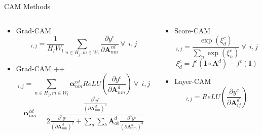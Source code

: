 \documentclass[aspectratio=169]{beamer}
\let\oldcite\cite %
\renewcommand{\cite}[1]{{\tiny\oldcite{#1}}}
\begin{document}
\begin{frame}{CAM Methods}
\begin{columns}[t] %
    \begin{column}{0.5\textwidth}
      \centering

    \begin{itemize}

    \item Grad-CAM \cite{Selvaraju2016}
        \begin{equation*}
                [\boldsymbol{\beta}_l^{cd}]_{i,j} = \frac{1}{H_lW_l} \sum_{n \in H_j, m \in W_l}\frac{\partial y^c}{\partial \mathbf{A}_{nm}^{cd}} \ \forall \ \ i,j 
        \end{equation*}
        
    \item Grad-CAM ++ \cite{Chattopadhyay2017}
            \begin{equation*}
                 [\boldsymbol{\beta}_l^{cd}]_{i,j} = \sum_{n \in H_j, m \in W_l}  \boldsymbol{\alpha}_{nm}^{cd} ReLU(\frac{\partial y^c}{\partial \mathbf{A}_{nm}^d}) \ \forall \ \ i,j 
            \end{equation*}
            \begin{equation*}
                \boldsymbol{\alpha}_{nm}^{cd} = \frac{\frac{\partial^2y^c}{(\partial \mathbf{A}_{nm}^d)^2}}{2\frac{\partial^2y^c}{(\partial \mathbf{A}_{nm}^d)^2} + \sum_a \sum_b \mathbf{A}_{ab}^d \frac{\partial^3y^c}{(\partial \mathbf{A}_{nm}^d)^3} }
            \end{equation*}
    \end{itemize}
      
    \end{column}

    \begin{column}{0.5\textwidth}
      \centering

    \begin{itemize}
        \item Score-CAM \cite{Wang2019}
        \begin{equation*}
            [\boldsymbol{\beta}_l^{cd}]_{i,j} = \frac{\exp(\xi_d^c)}{\sum_n \exp(\xi_n^c)}  \ \forall \ \ i,j 
        \end{equation*}
        \begin{equation*}
            \xi_d^c = f^c(\mathbf{I} \circ \mathbf{A}^d) - f^c(\mathbf{I})
        \end{equation*}
        
        
    \item Layer-CAM \cite{Jiang2021}
    \begin{equation*}
        [\boldsymbol{\beta}_l^{cd}]_{i,j} = ReLU(\frac{\partial y^c}{\partial \mathbf{A}_{ij}^d} )
    \end{equation*}
    \end{itemize}
      
    \end{column}
  \end{columns}
\end{frame}
\end{document}

